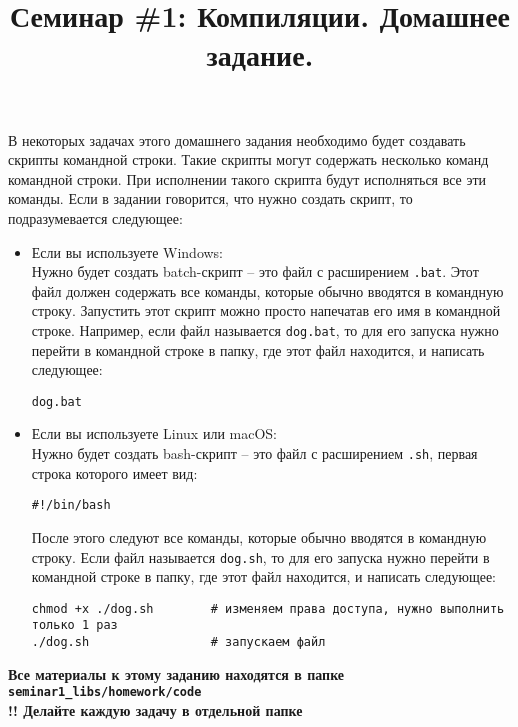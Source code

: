 \documentclass{article}
\begin{document}
\title{Семинар \#1: Компиляции. Домашнее задание. \vspace{-5ex}}\date{}\maketitle

В некоторых задачах этого домашнего задания необходимо будет создавать скрипты командной строки. Такие скрипты могут содержать несколько команд командной строки. При исполнении такого скрипта будут исполняться все эти команды. Если в задании говорится, что нужно создать скрипт, то подразумевается следующее:

\begin{itemize}
\item Если вы используете Windows:\\
Нужно будет создать batch-скрипт -- это файл с расширением \texttt{.bat}. Этот файл должен содержать все команды, которые обычно вводятся в командную строку. Запустить этот скрипт можно просто напечатав его имя в командной строке. Например, если файл называется \texttt{dog.bat}, то для его запуска нужно перейти в командной строке в папку, где этот файл находится, и написать следующее:
\begin{lstlisting}[style=csMiptBash]
dog.bat
\end{lstlisting}
\item Если вы используете Linux или macOS:\\
Нужно будет создать bash-скрипт -- это файл с расширением \texttt{.sh}, первая строка которого имеет вид:
\begin{lstlisting}[style=csMiptBash]
#!/bin/bash
\end{lstlisting}
После этого следуют все команды, которые обычно вводятся в командную строку.
Если файл называется \texttt{dog.sh}, то для его запуска нужно перейти в командной строке в папку, где этот файл находится, и написать следующее:
\begin{lstlisting}[style=csMiptBash]
chmod +x ./dog.sh        # изменяем права доступа, нужно выполнить только 1 раз 
./dog.sh                 # запускаем файл
\end{lstlisting}
\end{itemize} 

\noindent \textbf{Все материалы к этому заданию находятся в папке \texttt{seminar1\_libs/homework/code}}\\
\noindent \textbf{!! Делайте каждую задачу в отдельной папке}
\end{document}
